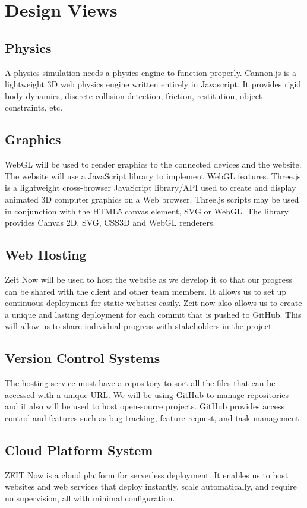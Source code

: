 \documentclass[onecolumn, draftclsnofoot,10pt, compsoc]{IEEEtran}
\begin{document}
\section{Design Views}

\subsection{Physics}
A physics simulation needs a physics engine to function properly. Cannon.js is a lightweight 3D web physics engine written entirely in Javascript. It provides rigid body dynamics, discrete collision detection, friction, restitution, object constraints, etc.

\subsection{Graphics}
WebGL will be used to render graphics to the connected devices and the website. The website will use a JavaScript library to implement WebGL features. Three.js is a lightweight cross-browser JavaScript library/API used to create and display animated 3D computer graphics on a Web browser. Three.js scripts may be used in conjunction with the HTML5 canvas element, SVG or WebGL. The library provides Canvas 2D, SVG, CSS3D and WebGL renderers.

\subsection{Web Hosting}
Zeit Now will be used to host the website as we develop it so that our progress can be shared with the client and other team members. It allows us to set up continuous deployment for static websites easily. Zeit now also allows us to create a unique and lasting deployment for each commit that is pushed to GitHub. This will allow us to share individual progress with stakeholders in the project. 

\subsection{Version Control Systems}
The hosting service must have a repository to sort all the files that can be accessed with a unique URL. We will be using GitHub to manage repositories and it also will be used to host open-source projects. GitHub provides access control and features such as bug tracking, feature request, and task management. 

\subsection{Cloud Platform System}
ZEIT Now is a cloud platform for serverless deployment. It enables us to host websites and web services that deploy instantly, scale automatically, and require no supervision, all with minimal configuration.
\end{document}
